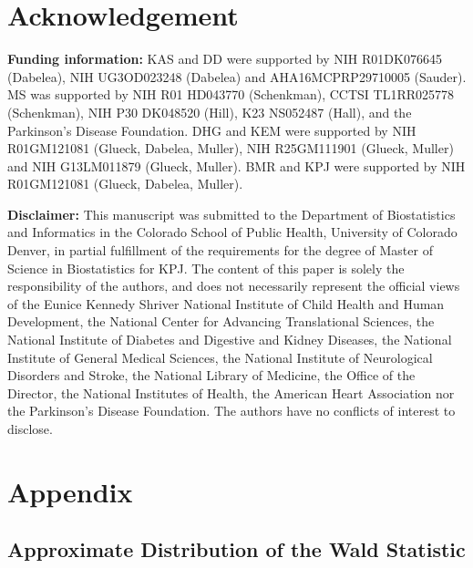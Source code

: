 \documentclass[11pt]{article}
\begin{document}
\section*{Acknowledgement}
\textbf{Funding information:} KAS and DD were supported by NIH R01DK076645 (Dabelea), NIH UG3OD023248 (Dabelea) and AHA16MCPRP29710005 (Sauder). MS was supported by NIH R01 HD043770 (Schenkman), CCTSI TL1RR025778 (Schenkman), NIH P30 DK048520 (Hill), K23 NS052487 (Hall), and the Parkinson's Disease Foundation. DHG and KEM were supported by NIH R01GM121081 (Glueck, Dabelea, Muller), NIH R25GM111901 (Glueck, Muller) and NIH G13LM011879 (Glueck, Muller). BMR and KPJ were supported by NIH R01GM121081 (Glueck, Dabelea, Muller). 

\vspace{1ex}

\noindent\textbf{Disclaimer:} This manuscript was submitted to the Department of Biostatistics and Informatics in the Colorado School of Public Health, University of Colorado Denver, in partial fulfillment of the requirements for the degree of Master of Science in Biostatistics for KPJ. The content of this paper is solely the responsibility of the authors, and does not necessarily represent the official views of the Eunice Kennedy Shriver National Institute of Child Health and Human Development, the National Center for Advancing Translational Sciences, the National Institute of Diabetes and Digestive and Kidney Diseases, the National Institute of General Medical Sciences, the National Institute of Neurological Disorders and Stroke, the National Library of Medicine, the Office of the Director, the National Institutes of Health, the American Heart Association nor the Parkinson's Disease Foundation. The authors have no conflicts of interest to disclose.

 


\appendix

\section{Appendix}
\subsection{Approximate Distribution of the Wald Statistic}
\label{llama}
\end{document}
